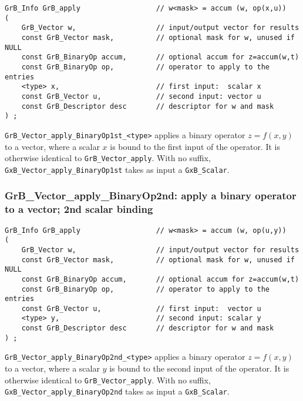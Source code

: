 \documentclass[12pt]{article}
\begin{document}
\begin{mdframed}[userdefinedwidth=6in]
{\footnotesize
\begin{verbatim}
GrB_Info GrB_apply                  // w<mask> = accum (w, op(x,u))
(
    GrB_Vector w,                   // input/output vector for results
    const GrB_Vector mask,          // optional mask for w, unused if NULL
    const GrB_BinaryOp accum,       // optional accum for z=accum(w,t)
    const GrB_BinaryOp op,          // operator to apply to the entries
    <type> x,                       // first input:  scalar x
    const GrB_Vector u,             // second input: vector u
    const GrB_Descriptor desc       // descriptor for w and mask
) ;
\end{verbatim} } \end{mdframed}

\verb'GrB_Vector_apply_BinaryOp1st_<type>'  applies a binary operator
$z=f(x,y)$ to a vector, where a scalar $x$ is bound to the first input of the
operator.  It is otherwise identical to \verb'GrB_Vector_apply'.  With no
suffix, \verb'GxB_Vector_apply_BinaryOp1st' takes as input a \verb'GxB_Scalar'. 

\subsubsection{{\sf GrB\_Vector\_apply\_BinaryOp2nd:} apply a binary operator to a vector; 2nd scalar binding}
\label{vector_apply2nd}

\begin{mdframed}[userdefinedwidth=6in]
{\footnotesize
\begin{verbatim}
GrB_Info GrB_apply                  // w<mask> = accum (w, op(u,y))
(
    GrB_Vector w,                   // input/output vector for results
    const GrB_Vector mask,          // optional mask for w, unused if NULL
    const GrB_BinaryOp accum,       // optional accum for z=accum(w,t)
    const GrB_BinaryOp op,          // operator to apply to the entries
    const GrB_Vector u,             // first input:  vector u
    <type> y,                       // second input: scalar y
    const GrB_Descriptor desc       // descriptor for w and mask
) ;
\end{verbatim} } \end{mdframed}

\verb'GrB_Vector_apply_BinaryOp2nd_<type>'  applies a binary operator
$z=f(x,y)$ to a vector, where a scalar $y$ is bound to the second input of the
operator.  It is otherwise identical to \verb'GrB_Vector_apply'.  With no
suffix, \verb'GxB_Vector_apply_BinaryOp2nd' takes as input a \verb'GxB_Scalar'. 
\end{document}
